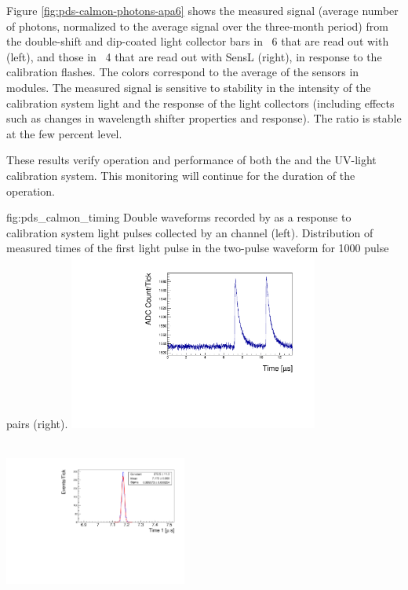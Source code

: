 Figure \ref{fig:pds-calmon-photons-apa6} shows the measured signal (average number of photons, normalized to the average signal over the three-month period) from the double-shift and dip-coated light collector bars in ~6 that are read out with   (left), and those in ~4 that are read out with SensL  (right), in response to the calibration flashes. The colors correspond to the average of the sensors in  modules. The measured signal is sensitive to stability in the intensity of the calibration system light and the response of the light collectors (including effects such as changes in wavelength shifter properties and  response). The ratio is stable at the few percent level.

These results verify operation and performance of both the  and the UV-light calibration system. This monitoring will continue for the duration of the  operation.

\begin{dunefigure}
 {fig:pds_calmon_timing}
 {Double waveforms recorded by   as a response to calibration system light pulses collected by an  channel (left). Distribution of measured times of the first light pulse in the two-pulse waveform for 1000 pulse pairs (right).}
  \includegraphics[height=5.8cm,width=0.45\linewidth]{graphics/pds-double-waveform-arapuca-example.pdf}
 \includegraphics[height=6cm,width=0.45\textwidth]{graphics/pds-example-t1.pdf}  \end{dunefigure}

